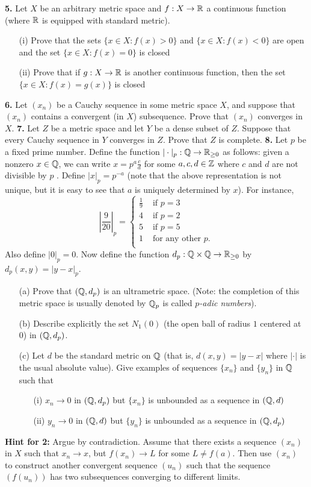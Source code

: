 \documentclass[11pt]{amsart}
\begin{document}
\skv
{\bf 5.} Let $X$ be an arbitrary metric space and $f:X\to{\mathbb R}$ a continuous function (where ${\mathbb R}$ is equipped with standard metric).
\begin{itemize}
\item[(i)] Prove that the sets $\{x\in X: f(x)>0\}$  and $\{x\in X: f(x)<0\}$ are open and the set $\{x\in X: f(x)=0\}$ is closed
\item[(ii)] Prove that if $g:X\to{\mathbb R}$ is another continuous function, then the set $\{x\in X: f(x)=g(x)\}$ is closed 
\end{itemize}
\skv
{\bf 6.} Let $(x_n)$ be a Cauchy sequence in some metric space $X$, and suppose that $(x_n)$ contains a convergent (in $X$) subsequence. Prove that $(x_n)$ converges in $X$.  
\skv
{\bf 7.} Let $Z$ be a metric space and let $Y$ be a dense subset of $Z$. Suppose that
every Cauchy sequence in $Y$ converges in $Z$. Prove that $Z$ is complete.
\skv
\skv
{\bf 8.} Let $p$ be a fixed prime number. Define the function
$|\cdot|_p: {\mathbb Q}\to{\mathbb R}_{\geq 0}$ as follows: given a nonzero
$x\in{\mathbb Q}$, we can write $x=p^a \frac{c}{d}$ for some $a,c,d\in {\mathbb Z}$
where $c$ and $d$ are not divisible by $p$ .
Define $|x|_p=p^{-a}$ (note that the above representation
is not unique, but it is easy to see that $a$ is uniquely determined by $x$). For instance, 
$$\left|\frac{9}{20}\right|_{p}=
\left\{
\begin{array}{ll}
\frac{1}{9}&\mbox{ if } p=3\\
4&\mbox{ if } p=2\\
5&\mbox{ if } p=5\\
1&\mbox{ for any other } p.\\
\end{array}
\right.$$
Also define $|0|_p=0$.
Now define the function $d_p:{\mathbb Q}\times {\mathbb Q}\to {\mathbb R}_{\geq 0}$
by $d_p(x,y)=|y-x|_p$.  
\begin{itemize}
\item[(a)] Prove that $({\mathbb Q},d_p)$ is an ultrametric space.
(Note: the completion of this metric space is usually denoted by
${\mathbb Q}_p$ is called {\it $p$-adic numbers}).
\item[(b)] Describe explicitly the set $N_1(0)$ (the open ball
of radius $1$ centered at $0$) in $({\mathbb Q},d_p)$.
\item[(c)] Let $d$ be the standard metric on ${\mathbb Q}$ (that is, $d(x,y)=|y-x|$
where $|\cdot|$ is the usual absolute value).
Give examples of sequences $\{x_n\}$ and $\{y_n\}$ in ${\mathbb Q}$ such that
\begin{itemize}
\item[(i)] $x_n\to 0$ in $({\mathbb Q},d_p)$ but $\{x_n\}$ is unbounded
as a sequence in $({\mathbb Q},d)$ 
\item[(ii)] $y_n\to 0$ in $({\mathbb Q},d)$ but $\{y_n\}$ is unbounded
as a sequence in $({\mathbb Q},d_p)$ 
\end{itemize}
\end{itemize}
\skv
\newpage
{\bf Hint for 2:} Argue by contradiction. Assume that there exists a sequence $(x_n)$ in $X$ such that $x_n\to x$, but $f(x_n)\to L$ for some $L\neq f(a)$. Then use $(x_n)$ to construct another convergent sequence $(u_n)$ 
such that the sequence $(f(u_n))$ has two subsequences converging to different limits.
\end{document}
